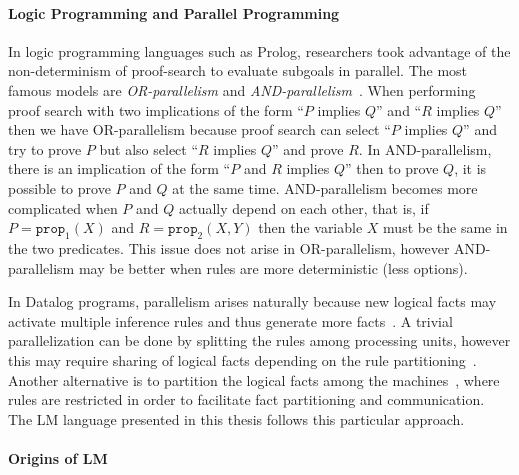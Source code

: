 \paragraph{Logic Programming and Parallel Programming}

In logic programming languages such as Prolog, researchers took advantage of the
non-determinism of proof-search to evaluate subgoals in parallel. The most
famous models are \emph{OR-parallelism} and
\emph{AND-parallelism}~\cite{Gupta:2001:PEP:504083.504085}. When performing
proof search with two implications of the form ``$P$ implies $Q$'' and ``$R$
implies $Q$'' then we have OR-parallelism because proof search can select ``$P$
implies $Q$'' and try to prove $P$ but also select ``$R$ implies $Q$'' and prove
$R$. In AND-parallelism, there is an implication of the form ``$P$ and $R$
implies $Q$'' then to prove $Q$, it is possible to prove $P$ and $Q$ at the same
time. AND-parallelism becomes more complicated when $P$ and $Q$ actually depend
on each other, that is, if $P = \mathtt{prop}_1(X)$ and $R = \mathtt{prop}_2(X,
Y)$ then the variable $X$ must be the same in the two predicates. This issue
does not arise in OR-parallelism, however AND-parallelism may be better when
rules are more deterministic (less options).

In Datalog programs, parallelism arises naturally because new logical facts may
activate multiple inference rules and thus generate more
facts~\cite{Ganguly:1990:FPP:93597.98724,Seib:1991:PDP:113413.113435,Wolfson:1988:DPL:971701.50242}.
A trivial parallelization can be done by splitting the rules among processing
units, however this may require sharing of logical facts depending on the rule
partitioning~\cite{Wolfson:1988:DPL:971701.50242}. Another alternative is to
partition the logical facts among the
machines~\cite{183073,Loo-condie-garofalakis-p2}, where rules are restricted in
order to facilitate fact partitioning and communication. The LM language
presented in this thesis follows this particular approach.

\paragraph{Origins of LM}

